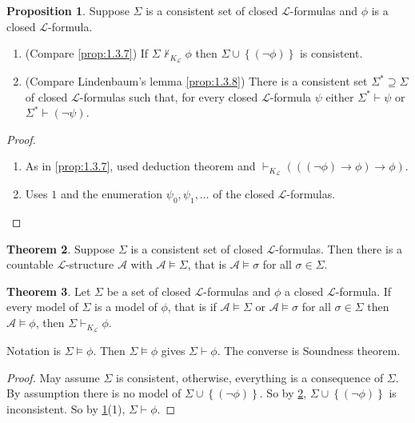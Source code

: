 \documentclass{article}
\newcommand{\rb}[1]{\left( #1 \right)}
\newcommand{\cb}[1]{\left\{ #1 \right\}}
\newcommand{\notb}[1]{\rb{\neg #1}}
\newcommand{\impb}[2]{\rb{#1 \rightarrow #2}}
\theoremstyle{definition}\newtheorem{definition}{Definition}[subsection]
\theoremstyle{definition}\newtheorem{remark}[definition]{Remark}
\theoremstyle{definition}\newtheorem*{example}{Example}
\theoremstyle{definition}\newtheorem*{note}{Note}
\newtheorem{proposition}[definition]{Proposition}
\newtheorem{theorem}[definition]{Theorem}
\begin{document}
\begin{proposition}
\label{prop:2.5.2}
Suppose $ \Sigma $ is a consistent set of closed $ \mathcal{L} $-formulas and $ \phi $ is a closed $ \mathcal{L} $-formula.
\begin{enumerate}
\item (Compare \ref{prop:1.3.7}) If $ \Sigma \not\vdash_{K_\mathcal{L}} \phi $ then $ \Sigma \cup \cb{\notb{\phi}} $ is consistent.
\item (Compare Lindenbaum's lemma \ref{prop:1.3.8}) There is a consistent set $ \Sigma^* \supseteq \Sigma $ of closed $ \mathcal{L} $-formulas such that, for every closed $ \mathcal{L} $-formula $ \psi $ either $ \Sigma^* \vdash \psi $ or $ \Sigma^* \vdash \notb{\psi} $.
\end{enumerate}
\end{proposition}

\begin{proof}
\hfill
\begin{enumerate}
\item As in \ref{prop:1.3.7}, used deduction theorem and $ \vdash_{K_\mathcal{L}} \impb{\impb{\notb{\phi}}{\phi}}{\phi} $.
\item Uses $ 1 $ and the enumeration $ \psi_0, \psi_1, \dots $ of the closed $ \mathcal{L} $-formulas.
\end{enumerate}
\end{proof}

\begin{theorem}
\label{thm:2.5.3}
Suppose $ \Sigma $ is a consistent set of closed $ \mathcal{L} $-formulas. Then there is a countable $ \mathcal{L} $-structure $ \mathcal{A} $ with $ \mathcal{A} \vDash \Sigma $, that is $ \mathcal{A} \vDash \sigma $ for all $ \sigma \in \Sigma $.
\end{theorem}

\begin{theorem}
\label{thm:2.5.4}
Let $ \Sigma $ be a set of closed $ \mathcal{L} $-formulas and $ \phi $ a closed $ \mathcal{L} $-formula. If every model of $ \Sigma $ is a model of $ \phi $, that is if $ \mathcal{A} \vDash \Sigma $ or $ \mathcal{A} \vDash \sigma $ for all $ \sigma \in \Sigma $ then $ \mathcal{A} \vDash \phi $, then $ \Sigma \vdash_{K_\mathcal{L}} \phi $.
\end{theorem}

Notation is $ \Sigma \vDash \phi $. Then $ \Sigma \vDash \phi $ gives $ \Sigma \vdash \phi $. The converse is Soundness theorem.

\begin{proof}
May assume $ \Sigma $ is consistent, otherwise, everything is a consequence of $ \Sigma $. By assumption there is no model of $ \Sigma \cup \cb{\notb{\phi}} $. So by \ref{thm:2.5.3}, $ \Sigma \cup \cb{\notb{\phi}} $ is inconsistent. So by \ref{prop:2.5.2}(1), $ \Sigma \vdash \phi $.
\end{proof}
\end{document}
